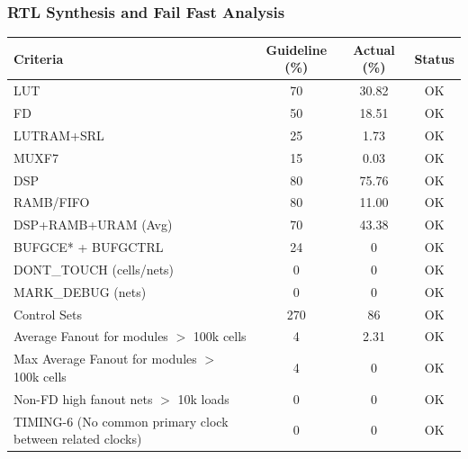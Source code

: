 \documentclass{article}
\begin{document}
\subsubsection{RTL Synthesis and Fail Fast Analysis}


\begin{table}[H]
    \centering
    \begin{tabular}{|l|c|c|c|}
    \hline
    \textbf{Criteria} & \textbf{Guideline (\%)} & \textbf{Actual (\%)} & \textbf{Status} \\ \hline
    LUT               & 70                      & 30.82               & OK              \\ \hline
    FD                & 50                      & 18.51               & OK              \\ \hline
    LUTRAM+SRL        & 25                      & 1.73                & OK              \\ \hline
    MUXF7             & 15                      & 0.03                & OK              \\ \hline
    DSP               & 80                      & 75.76               & OK              \\ \hline
    RAMB/FIFO         & 80                      & 11.00               & OK              \\ \hline
    DSP+RAMB+URAM (Avg) & 70                    & 43.38               & OK              \\ \hline
    BUFGCE* + BUFGCTRL & 24                     & 0                   & OK              \\ \hline
    DONT\_TOUCH (cells/nets) & 0               & 0                   & OK              \\ \hline
    MARK\_DEBUG (nets) & 0                     & 0                   & OK              \\ \hline
    Control Sets      & 270                     & 86                  & OK              \\ \hline
    Average Fanout for modules $>$ 100k cells & 4 & 2.31            & OK              \\ \hline
    Max Average Fanout for modules $>$ 100k cells & 4 & 0            & OK              \\ \hline
    Non-FD high fanout nets $>$ 10k loads & 0    & 0                   & OK              \\ \hline
    TIMING-6 (No common primary clock between related clocks)          & 0                  & 0               & OK              \\ \hline

\end{tabular}
\end{table}
\end{document}
